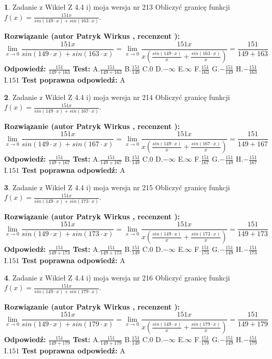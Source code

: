 \documentclass[12pt, a4paper]{article}
\theoremstyle{definition} %
\newtheorem{zad}{}
\newcommand{\zadStart}[1]{\begin{zad}#1\newline}
\newcommand{\zadStop}{\end{zad}}
\newcommand{\rozwStart}[2]{\noindent \textbf{Rozwiązanie (autor #1 , recenzent #2): }\newline}
\newcommand{\rozwStop}{\newline}
\newcommand{\odpStart}{\noindent \textbf{Odpowiedź:}\newline}
\newcommand{\odpStop}{\newline}
\newcommand{\testStart}{\noindent \textbf{Test:}\newline}
\newcommand{\testStop}{\newline}
\newcommand{\kluczStart}{\noindent \textbf{Test poprawna odpowiedź:}\newline}
\newcommand{\kluczStop}{\newline}
\begin{document}
\zadStart{Zadanie z Wikieł Z 4.4 i) moja wersja nr 213}
Obliczyć granicę funkcji $f(x)=\frac{151x}{sin(149\cdot x) +sin(163\cdot x)}$.
\zadStop
\rozwStart{Patryk Wirkus}{}
$$\lim\limits_{x\to 0}\frac{151x}{sin(149\cdot x) +sin(163\cdot x)}=\lim\limits_{x\to 0}\frac{151x}{x(\frac{sin(149\cdot x)}{x}+\frac{sin(163\cdot x)}{x})}=\frac{151}{149+163}$$
\rozwStop
\odpStart
$\frac{151}{149+163}$
\odpStop
\testStart
A.$\frac{151}{149+163}$
B.$\frac{151}{149}$
C.$0$
D.$-\infty$
E.$\infty$
F.$\frac{151}{163}$
G.$-\frac{151}{149}$
H.$-\frac{151}{163}$
I.$151$
\testStop
\kluczStart
A
\kluczStop



\zadStart{Zadanie z Wikieł Z 4.4 i) moja wersja nr 214}
Obliczyć granicę funkcji $f(x)=\frac{151x}{sin(149\cdot x) +sin(167\cdot x)}$.
\zadStop
\rozwStart{Patryk Wirkus}{}
$$\lim\limits_{x\to 0}\frac{151x}{sin(149\cdot x) +sin(167\cdot x)}=\lim\limits_{x\to 0}\frac{151x}{x(\frac{sin(149\cdot x)}{x}+\frac{sin(167\cdot x)}{x})}=\frac{151}{149+167}$$
\rozwStop
\odpStart
$\frac{151}{149+167}$
\odpStop
\testStart
A.$\frac{151}{149+167}$
B.$\frac{151}{149}$
C.$0$
D.$-\infty$
E.$\infty$
F.$\frac{151}{167}$
G.$-\frac{151}{149}$
H.$-\frac{151}{167}$
I.$151$
\testStop
\kluczStart
A
\kluczStop



\zadStart{Zadanie z Wikieł Z 4.4 i) moja wersja nr 215}
Obliczyć granicę funkcji $f(x)=\frac{151x}{sin(149\cdot x) +sin(173\cdot x)}$.
\zadStop
\rozwStart{Patryk Wirkus}{}
$$\lim\limits_{x\to 0}\frac{151x}{sin(149\cdot x) +sin(173\cdot x)}=\lim\limits_{x\to 0}\frac{151x}{x(\frac{sin(149\cdot x)}{x}+\frac{sin(173\cdot x)}{x})}=\frac{151}{149+173}$$
\rozwStop
\odpStart
$\frac{151}{149+173}$
\odpStop
\testStart
A.$\frac{151}{149+173}$
B.$\frac{151}{149}$
C.$0$
D.$-\infty$
E.$\infty$
F.$\frac{151}{173}$
G.$-\frac{151}{149}$
H.$-\frac{151}{173}$
I.$151$
\testStop
\kluczStart
A
\kluczStop



\zadStart{Zadanie z Wikieł Z 4.4 i) moja wersja nr 216}
Obliczyć granicę funkcji $f(x)=\frac{151x}{sin(149\cdot x) +sin(179\cdot x)}$.
\zadStop
\rozwStart{Patryk Wirkus}{}
$$\lim\limits_{x\to 0}\frac{151x}{sin(149\cdot x) +sin(179\cdot x)}=\lim\limits_{x\to 0}\frac{151x}{x(\frac{sin(149\cdot x)}{x}+\frac{sin(179\cdot x)}{x})}=\frac{151}{149+179}$$
\rozwStop
\odpStart
$\frac{151}{149+179}$
\odpStop
\testStart
A.$\frac{151}{149+179}$
B.$\frac{151}{149}$
C.$0$
D.$-\infty$
E.$\infty$
F.$\frac{151}{179}$
G.$-\frac{151}{149}$
H.$-\frac{151}{179}$
I.$151$
\testStop
\kluczStart
A
\kluczStop
\end{document}
